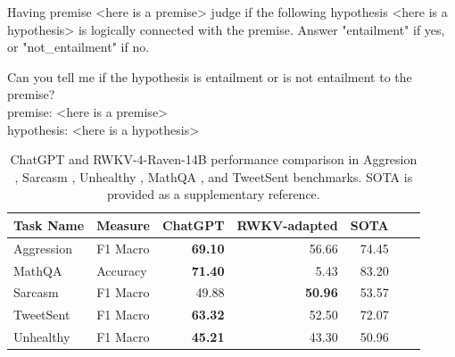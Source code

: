 \documentclass[11pt]{article}
\begin{document}
\begin{tcolorbox}[colback=white,colframe=black!75!black,title=An example ChatGPT prompt for recognizing textual entailment (RTE)]
    Having premise <here is a premise> judge if the following hypothesis <here is a hypothesis> is logically connected with the premise. Answer "entailment" if yes, or "not\_entailment" if no.
\end{tcolorbox}

\begin{tcolorbox}[colback=white,colframe=black!75!black,title=A re-ordered RWKV prompt for RTE taking into account the nature of the RNN]
    Can you tell me if the hypothesis is entailment or is not entailment to the premise?\\premise: <here is a premise>\\hypothesis: <here is a hypothesis>
\end{tcolorbox}



\begin{table}
\centering
\begin{tabular}{llrrrrr}
\toprule
  Task Name      & Measure &  ChatGPT   & RWKV-adapted & SOTA\\\midrule
   Aggression & F1 Macro & \textbf{69.10} & 56.66 & 74.45 \\
   MathQA & Accuracy & \textbf{71.40} & 5.43 & 83.20\\
   Sarcasm & F1 Macro & 49.88 & \textbf{50.96} & 53.57\\
   TweetSent & F1 Macro & \textbf{63.32} & 52.50 & 72.07\\
   Unhealthy & F1 Macro & \textbf{45.21} & 43.30 & 50.96\\
\bottomrule 
\end{tabular}
\caption{ChatGPT and RWKV-4-Raven-14B performance comparison in Aggresion  \cite{wulczyn2017}, Sarcasm \cite{Siddiqui2019sarcasmania}, Unhealthy \cite{Unhealthy2020}, MathQA \cite{cobbe2021training}, and TweetSent \cite{tweeteval} benchmarks. SOTA is provided as a supplementary reference.}
\label{tab:RWKVvsChaGPT}
\end{table}
\end{document}
